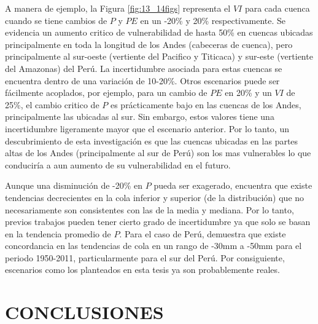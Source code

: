 \documentclass[12pt]{article}
\begin{document}
A manera de ejemplo, la Figura \ref{fig:13_14figs} representa el $VI$ para cada cuenca cuando se tiene cambios de $P$ y $PE$ en un -20\% y 20\% respectivamente. Se evidencia un aumento critico de vulnerabilidad de hasta 50\% en cuencas ubicadas principalmente en toda la longitud de los Andes (cabeceras de cuenca), pero principalmente al sur-oeste (vertiente del Pacifico y Titicaca) y sur-este (vertiente del Amazonas) del Perú. La incertidumbre asociada para estas cuencas se encuentra dentro de una variación de 10-20\%. Otros escenarios puede ser fácilmente acoplados, por ejemplo, para un cambio de $PE$ en 20\% y un $VI$ de 25\%, el cambio critico de $P$ es prácticamente bajo en las cuencas de los Andes, principalmente las ubicadas al sur. Sin embargo, estos valores tiene una incertidumbre ligeramente mayor que el escenario anterior. Por lo tanto, un descubrimiento de esta investigación es que las cuencas ubicadas en las partes altas de los Andes (principalmente al sur de Perú) son los mas vulnerables lo que conduciría a aun aumento de su vulnerabilidad en el futuro.

Aunque una disminución de -20\% en $P$ pueda ser exagerado, \citet{lausier2018overlooked} encuentra que existe tendencias decrecientes en la cola inferior y superior (de la distribución) que no necesariamente son consistentes con las de la media y mediana. Por lo tanto, previos trabajos pueden tener cierto grado de incertidumbre ya que solo se basan en la tendencia promedio de $P$. Para el caso de Perú, \citet{lausier2018overlooked} demuestra que existe concordancia en las tendencias de cola en un rango de -30mm a -50mm para el periodo 1950-2011, particularmente para el sur del Perú. Por consiguiente, escenarios como los planteados en esta tesis ya son probablemente reales.



\clearpage
\vspace*{0.5mm}
\section{CONCLUSIONES}
\end{document}
